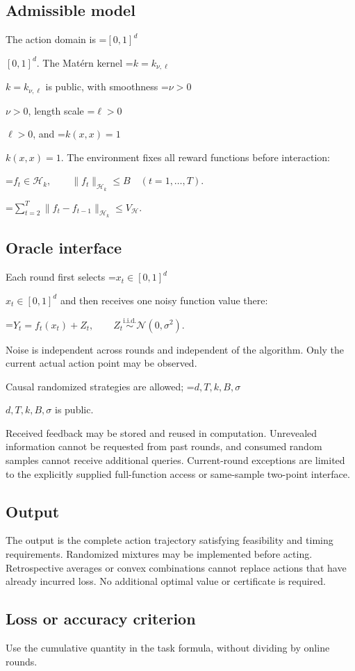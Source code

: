 \documentclass[10pt,a4paper]{article}
\newcommand{\AtlasMath}[1]{\par\begingroup\centering\setbox0=\hbox{$\displaystyle #1$}\ifdim\wd0>1.4\linewidth\typeout{ATLAS WIDE FORMULA: \the\wd0}\fi\ifdim\wd0>\linewidth\resizebox{\linewidth}{!}{\box0}\else\box0\fi\par\endgroup}
\newcommand{\AtlasInlineMath}[1]{\begingroup\setbox0=\hbox{$#1$}\ifdim\wd0>.4\linewidth\endgroup\AtlasMath{#1}\else\endgroup$#1$\fi}
\begin{document}
\subsection{Admissible model}
The action domain is \AtlasInlineMath{[0,1]^d}. The Matérn kernel \AtlasInlineMath{k=k_{\nu,\ell}} is public, with smoothness \AtlasInlineMath{\nu>0}, length scale \AtlasInlineMath{\ell>0}, and \AtlasInlineMath{k(x,x)=1}. The environment fixes all reward functions before interaction:


\AtlasMath{f_t\in\mathcal{H}_k,\qquad \|f_t\|_{\mathcal{H}_k}\le B\quad(t=1,\ldots,T).}



\AtlasMath{\sum_{t=2}^{T}\|f_t-f_{t-1}\|_{\mathcal{H}_k}\le V_{\mathcal{H}}.}


\subsection{Oracle interface}
Each round first selects \AtlasInlineMath{x_t\in[0,1]^d} and then receives one noisy function value there:


\AtlasMath{Y_t=f_t(x_t)+Z_t,\qquad Z_t\overset{\mathrm{i.i.d.}}\sim\mathcal{N}(0,\sigma^2).}


Noise is independent across rounds and independent of the algorithm. Only the current actual action point may be observed.

Causal randomized strategies are allowed; \AtlasInlineMath{d,T,k,B,\sigma} is public.

Received feedback may be stored and reused in computation. Unrevealed information cannot be requested from past rounds, and consumed random samples cannot receive additional queries. Current-round exceptions are limited to the explicitly supplied full-function access or same-sample two-point interface.

\subsection{Output}
The output is the complete action trajectory satisfying feasibility and timing requirements. Randomized mixtures may be implemented before acting. Retrospective averages or convex combinations cannot replace actions that have already incurred loss. No additional optimal value or certificate is required.

\subsection{Loss or accuracy criterion}
Use the cumulative quantity in the task formula, without dividing by online rounds.
\end{document}
